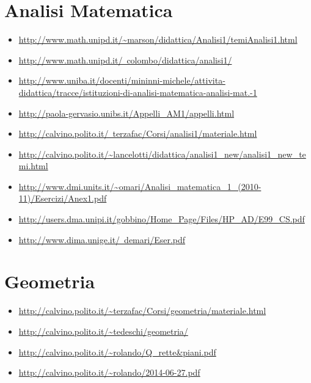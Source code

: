 \documentclass[a4paper,10pt]{article}
\begin{document}
\section{Analisi Matematica}
\begin{itemize}
 \item \url{http://www.math.unipd.it/~marson/didattica/Analisi1/temiAnalisi1.html}
 \item \href{http://www.math.unipd.it/~colombo/didattica/analisi1/}{http://www.math.unipd.it/~colombo/didattica/analisi1/}
 \item \url{http://www.uniba.it/docenti/mininni-michele/attivita-didattica/tracce/istituzioni-di-analisi-matematica-analisi-mat.-1}
 \item \url{http://paola-gervasio.unibs.it/Appelli_AM1/appelli.html}
 \item \href{http://calvino.polito.it/~terzafac/Corsi/analisi1/materiale.html}{http://calvino.polito.it/~terzafac/Corsi/analisi1/materiale.html}
 \item \url{http://calvino.polito.it/~lancelotti/didattica/analisi1_new/analisi1_new_temi.html}
 \item \url{http://www.dmi.units.it/~omari/Analisi_matematica_1_(2010-11)/Esercizi/Anex1.pdf}
 \item \url{http://users.dma.unipi.it/gobbino/Home_Page/Files/HP_AD/E99_CS.pdf}
 \item \href{http://www.dima.unige.it/~demari/Eser.pdf}{http://www.dima.unige.it/~demari/Eser.pdf}
\end{itemize}

\section{Geometria}
 \begin{itemize}
  \item \url{http://calvino.polito.it/~terzafac/Corsi/geometria/materiale.html}
  \item \url{http://calvino.polito.it/~tedeschi/geometria/}
  \item \url{http://calvino.polito.it/~rolando/Q_rette&piani.pdf}
  \item \url{http://calvino.polito.it/~rolando/2014-06-27.pdf}  
 \end{itemize}
\end{document}
